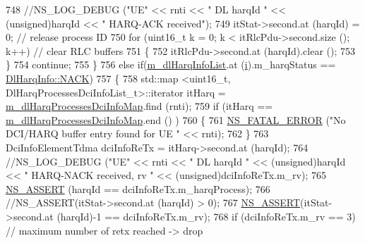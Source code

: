 \begin{DoxyCode}
748                                 \textcolor{comment}{//NS\_LOG\_DEBUG ("UE" << rnti << " DL harqId " << (unsigned)harqId << "
       HARQ-ACK received");}
749                                 itStat->second.at (harqId) = 0;    \textcolor{comment}{// release process ID}
750                                 \textcolor{keywordflow}{for} (uint16\_t k = 0; k < itRlcPdu->second.size (); k++)         \textcolor{comment}{// clear
       RLC buffers}
751                                 \{
752                                         itRlcPdu->second.at (harqId).clear ();
753                                 \}
754                                 \textcolor{keywordflow}{continue};
755                         \}
756                         \textcolor{keywordflow}{else} \textcolor{keywordflow}{if}(\hyperlink{classns3_1_1MmWaveFlexTtiMacScheduler_af30d399e8abceedfe762a84ea26336b6}{m\_dlHarqInfoList}.at (\hyperlink{bernuolliDistribution_8m_a6f6ccfcf58b31cb6412107d9d5281426}{i}).m\_harqStatus == 
      \hyperlink{structns3_1_1DlHarqInfo_a922d2bc13ae01f93cde1a8b4bfccad14ae0560b883a5e22a4d4c40ac562e80374}{DlHarqInfo::NACK})
757                         \{
758                                 std::map <uint16\_t, DlHarqProcessesDciInfoList\_t>::iterator itHarq = 
      \hyperlink{classns3_1_1MmWaveFlexTtiMacScheduler_a2820fea8cd85e2351bc0b046bdfb8414}{m\_dlHarqProcessesDciInfoMap}.find (rnti);
759                                 \textcolor{keywordflow}{if} (itHarq == \hyperlink{classns3_1_1MmWaveFlexTtiMacScheduler_a2820fea8cd85e2351bc0b046bdfb8414}{m\_dlHarqProcessesDciInfoMap}.end ()
      )
760                                 \{
761                                         \hyperlink{group__fatal_ga5131d5e3f75d7d4cbfd706ac456fdc85}{NS\_FATAL\_ERROR} (\textcolor{stringliteral}{"No DCI/HARQ buffer entry found for
       UE "} << rnti);
762                                 \}
763                                 DciInfoElementTdma dciInfoReTx = itHarq->second.at (harqId);
764                                 \textcolor{comment}{//NS\_LOG\_DEBUG ("UE" << rnti << " DL harqId " << (unsigned)harqId << "
       HARQ-NACK received, rv " << (unsigned)dciInfoReTx.m\_rv);}
765                                 \hyperlink{assert_8h_a6dccdb0de9b252f60088ce281c49d052}{NS\_ASSERT} (harqId == dciInfoReTx.m\_harqProcess);
766                                 \textcolor{comment}{//NS\_ASSERT(itStat->second.at (harqId) > 0);}
767                                 \hyperlink{assert_8h_a6dccdb0de9b252f60088ce281c49d052}{NS\_ASSERT}(itStat->second.at (harqId)-1 == dciInfoReTx.m\_rv);
768                                 \textcolor{keywordflow}{if} (dciInfoReTx.m\_rv == 3) \textcolor{comment}{// maximum number of retx reached -> drop
}
\end{DoxyCode}
